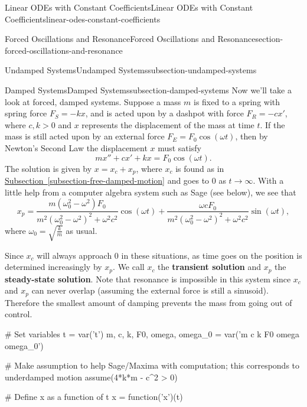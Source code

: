 \documentclass[oneside,10pt,]{book}
\newcommand{\terminology}[1]{\textbf{#1}}
\numberwithin{equation}{section}
\newcommand{\gt}{>}
\begin{document}
\begin{chapterptx}{Linear ODEs with Constant Coefficients}{}{Linear ODEs with Constant Coefficients}{}{}{linear-odes-constant-coefficients}
\begin{sectionptx}{Forced Oscillations and Resonance}{}{Forced Oscillations and Resonance}{}{}{section-forced-oscillations-and-resonance}
\begin{subsectionptx}{Undamped Systems}{}{Undamped Systems}{}{}{subsection-undamped-systems}
\end{subsectionptx}
%
%
\typeout{************************************************}
\typeout{************************************************}
%
\begin{subsectionptx}{Damped Systems}{}{Damped Systems}{}{}{subsection-damped-systems}
\hypertarget{p-253}{}%
Now we'll take a look at forced, damped systems. Suppose a mass \(m\) is fixed to a spring with spring force \(F_{S} = -kx\), and is acted upon by a dashpot with force \(F_{R} = -cx'\), where \(c,k \gt 0\) and \(x\) represents the displacement of the mass at time \(t\). If the mass is still acted upon by an external force \(F_{E} = F_{0}\cos(\omega t)\), then by Newton's Second Law the displacement \(x\) must satisfy%
\begin{equation*}
mx'' + cx' + kx = F_{0}\cos(\omega t).
\end{equation*}
The solution is given by \(x = x_{c} + x_{p}\), where \(x_{c}\) is found as in \hyperref[subsection-free-damped-motion]{Subsection~\ref{subsection-free-damped-motion}} and goes to \(0\) as \(t\to\infty\). With a little help from a computer algebra system such as Sage (see below), we see that%
\begin{equation*}
x_{p} = \frac{m(\omega_{0}^{2} - \omega^{2})F_{0}}{m^{2}(\omega_{0}^{2} - \omega^{2})^{2} + \omega^{2}c^{2}}\cos(\omega t) + \frac{\omega c F_{0}}{m^{2}(\omega_{0}^{2} - \omega^{2})^{2} + \omega^{2}c^{2}}\sin(\omega t),
\end{equation*}
where \(\omega_{0} = \sqrt{\frac{k}{m}}\) as usual.%
\par
\hypertarget{p-254}{}%
Since \(x_{c}\) will always approach \(0\) in these situations, as time goes on the position is determined increasingly by \(x_{p}\). We call \(x_{c}\) the \terminology{transient solution} and \(x_{p}\) the \terminology{steady-state solution}. Note that resonance is impossible in this system since \(x_{c}\) and \(x_{p}\) can never overlap (assuming the external force is still a sinusoid). Therefore the smallest amount of damping prevents the mass from going out of control.%
\begin{sageinput}
# Set variables
t = var('t')
m, c, k, F0, omega, omega_0 = var('m c k F0 omega omega_0')

# Make assumption to help Sage/Maxima with computation; this corresponds to underdamped motion
assume(4*k*m - c^2 > 0)

# Define x as a function of t
x = function('x')(t)


\end{sageinput}
\end{subsectionptx}
\end{sectionptx}
\end{chapterptx}
\end{document}
